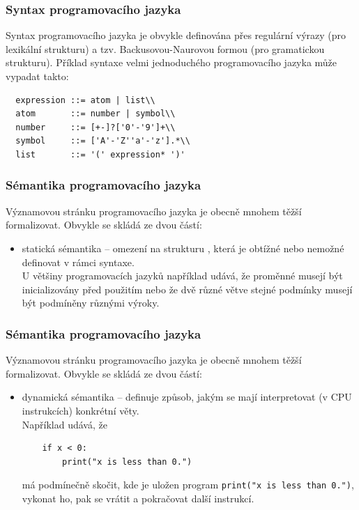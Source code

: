 \documentclass[aspectratio=169,11pt,svgnames]{beamer}
\begin{document}
\begin{frame}[fragile]
 \frametitle{Syntax programovacího jazyka}
 Syntax programovacího jazyka je obvykle definována přes \alert{regulární
 výrazy} (pro lexikální strukturu) a tzv. \alert{Backusovou-Naurovou formou}
 (pro gramatickou strukturu).
 \pause
 Příklad syntaxe velmi jednoduchého programovacího jazyka může vypadat takto:
 \begin{verbatim}
  expression ::= atom | list\\
  atom       ::= number | symbol\\
  number     ::= [+-]?['0'-'9']+\\
  symbol     ::= ['A'-'Z''a'-'z'].*\\
  list       ::= '(' expression* ')'
 \end{verbatim}
\end{frame}

\begin{frame}[fragile]
 \frametitle{Sémantika programovacího jazyka}
 Významovou stránku programovacího jazyka je obecně mnohem těžší formalizovat.
 \pause
 Obvykle se skládá ze dvou částí:
 \begin{itemize}
  \item \alert{statická sémantika} -- omezení na strukturu , která je
   obtížné nebo nemožné definovat v rámci syntaxe.\\
   \pause
   U většiny programovacích jazyků například udává, že proměnné musejí být
   inicializovány před použitím nebo že dvě různé větve stejné podmínky musejí
   být podmíněny různými výroky.
 \end{itemize}
\end{frame}

\begin{frame}[fragile]
 \frametitle{Sémantika programovacího jazyka}
 Významovou stránku programovacího jazyka je obecně mnohem těžší formalizovat.
 Obvykle se skládá ze dvou částí:
 \begin{itemize}
  \item \alert{dynamická sémantika} -- definuje způsob, jakým se mají
   interpretovat (v CPU instrukcích) konkrétní věty.\\
   \pause
   Například udává, že
   \begin{verbatim}
    if x < 0:
        print("x is less than 0.")
   \end{verbatim}
   \vspace*{-1.5em}
   má podmínečně skočit, kde je uložen program \texttt{print("x is less than
   0.")}, vykonat ho, pak se vrátit a pokračovat další instrukcí.
 \end{itemize}
\end{frame}
\end{document}

